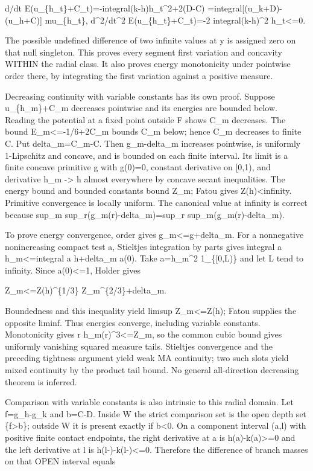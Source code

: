 \documentclass[11pt]{article}
\begin{document}
d/dt E(u\_\{h\_t\}+C\_t)=-integral(k-h)h\_t\textasciicircum{}2+2(D-C)
                         =integral[(u\_k+D)-(u\_h+C)] mu\_\{h\_t\},
d\textasciicircum{}2/dt\textasciicircum{}2 E(u\_\{h\_t\}+C\_t)=-2 integral(k-h)\textasciicircum{}2 h\_t<=0.

The possible undefined difference of two infinite values at y is assigned zero on that null singleton. This proves every segment first variation and concavity WITHIN the radial class. It also proves energy monotonicity under pointwise order there, by integrating the first variation against a positive measure.

Decreasing continuity with variable constants has its own proof. Suppose u\_\{h\_m\}+C\_m decreases pointwise and its energies are bounded below. Reading the potential at a fixed point outside F shows C\_m decreases. The bound E\_m<=-1/6+2C\_m bounds C\_m below; hence C\_m decreases to finite C. Put delta\_m=C\_m-C. Then g\_m-delta\_m increases pointwise, is uniformly 1-Lipschitz and concave, and is bounded on each finite interval. Its limit is a finite concave primitive g with g(0)=0, constant derivative on [0,1), and derivative h\_m -> h almost everywhere by concave secant inequalities. The energy bound and bounded constants bound Z\_m; Fatou gives Z(h)<infinity. Primitive convergence is locally uniform. The canonical value at infinity is correct because sup\_m sup\_r(g\_m(r)-delta\_m)=sup\_r sup\_m(g\_m(r)-delta\_m).

To prove energy convergence, order gives g\_m<=g+delta\_m. For a nonnegative nonincreasing compact test a, Stieltjes integration by parts gives integral a h\_m<=integral a h+delta\_m a(0). Take a=h\_m\textasciicircum{}2 1\_\{[0,L)\} and let L tend to infinity. Since a(0)<=1, Holder gives

Z\_m<=Z(h)\textasciicircum{}\{1/3\} Z\_m\textasciicircum{}\{2/3\}+delta\_m.

Boundedness and this inequality yield limsup Z\_m<=Z(h); Fatou supplies the opposite liminf. Thus energies converge, including variable constants. Monotonicity gives r h\_m(r)\textasciicircum{}3<=Z\_m, so the common cubic bound gives uniformly vanishing squared measure tails. Stieltjes convergence and the preceding tightness argument yield weak MA continuity; two such slots yield mixed continuity by the product tail bound. No general all-direction decreasing theorem is inferred.

Comparison with variable constants is also intrinsic to this radial domain. Let f=g\_h-g\_k and b=C-D. Inside W the strict comparison set is the open depth set \{f>b\}; outside W it is present exactly if b<0. On a component interval (a,l) with positive finite contact endpoints, the right derivative at a is h(a)-k(a)>=0 and the left derivative at l is h(l-)-k(l-)<=0. Therefore the difference of branch masses on that OPEN interval equals
\end{document}
